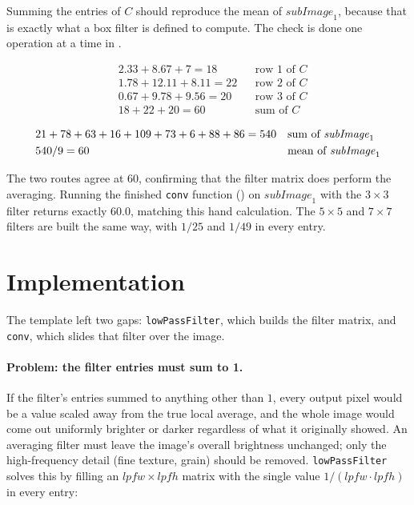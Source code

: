 Summing the entries of $C$ should reproduce the mean of $\mathit{subImage}_1$,
because that is exactly what a box filter is defined to compute. The check is
done one operation at a time in .

\begin{align*}
&2.33 + 8.67 + 7      = 18   && \text{row 1 of } C \\
&1.78 + 12.11 + 8.11  = 22   && \text{row 2 of } C \\
&0.67 + 9.78 + 9.56   = 20   && \text{row 3 of } C \\
&18 + 22 + 20         = 60   && \text{sum of } C
\end{align*}

\begin{align}
\label{eq:hw3-checksum}
&21+78+63+16+109+73+6+88+86 = 540 && \text{sum of } \mathit{subImage}_1 \\
&540 / 9 = 60 && \text{mean of } \mathit{subImage}_1 \notag
\end{align}

The two routes agree at $60$, confirming that the filter matrix does perform
the averaging. Running the finished \texttt{conv} function
() on $\mathit{subImage}_1$ with the $3\times3$ filter
returns exactly $60.0$, matching this hand calculation. The $5\times5$ and
$7\times7$ filters are built the same way, with $1/25$ and $1/49$ in every
entry.

\section{Implementation}
\label{sec:hw3-impl}

The template left two gaps: \texttt{lowPassFilter}, which builds the filter
matrix, and \texttt{conv}, which slides that filter over the image.

\paragraph{Problem: the filter entries must sum to 1.} If the filter's entries
summed to anything other than $1$, every output pixel would be a value scaled
away from the true local average, and the whole image would come out
uniformly brighter or darker regardless of what it originally showed. An
averaging filter must leave the image's overall brightness unchanged; only the
high-frequency detail (fine texture, grain) should be removed. \texttt{lowPassFilter} solves this by filling an $\mathit{lpfw}\times\mathit{lpfh}$
matrix with the single value $1/(\mathit{lpfw}\cdot\mathit{lpfh})$ in every
entry:

